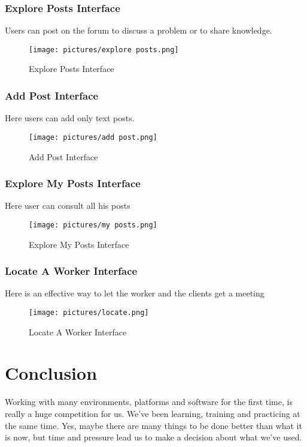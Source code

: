\documentclass[12pt]{report}
\begin{document}
\subsubsection{Explore Posts Interface}
Users can post on the forum to discuss a problem or to share knowledge.
\begin{figure}[!htbp]

        \centering
    \texttt{[image: pictures/explore posts.png]}
    \caption{Explore Posts Interface}
    \label{fig:explore_posts}
\end{figure}
\subsubsection{Add Post Interface}
Here users can add only text posts.
\begin{figure}[!htbp]

        \centering
    \texttt{[image: pictures/add post.png]}
    \caption{Add Post Interface}
    \label{fig:addposts_interface}
\end{figure}
\pagebreak
\subsubsection{Explore My Posts Interface}
Here user can consult all his posts
\begin{figure}[!htbp]

        \centering
    \texttt{[image: pictures/my posts.png]}
    \caption{Explore My Posts Interface}
    \label{fig:myposts_interface}
\end{figure}
\pagebreak
\subsubsection{Locate A Worker Interface}
Here is an effective way to let the worker and the clients get a meeting
\begin{figure}[!htbp]

        \centering
    \texttt{[image: pictures/locate.png]}
    \caption{Locate A Worker Interface}
    \label{fig:locate_interface}
\end{figure}
\pagebreak
\section*{Conclusion}
Working with many environments, platforms and software for the first time, is really a huge competition for us. We've been learning, training and practicing at the same time. Yes, maybe there are many things to be done better than what it is now, but time and pressure lead us to make a decision about what we've used.
\end{document}
